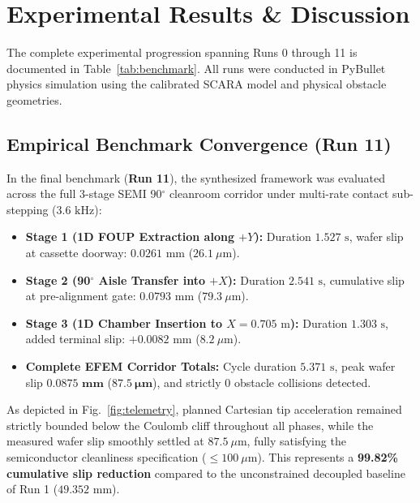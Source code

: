 \documentclass{article}
\begin{document}
\section{Experimental Results \& Discussion}
The complete experimental progression spanning Runs 0 through 11 is documented in Table~\ref{tab:benchmark}. All runs were conducted in PyBullet physics simulation using the calibrated SCARA model and physical obstacle geometries.

\subsection{Empirical Benchmark Convergence (Run 11)}
In the final benchmark (\textbf{Run 11}), the synthesized framework was evaluated across the full 3-stage SEMI 90$^\circ$ cleanroom corridor under multi-rate contact sub-stepping ($3.6\text{ kHz}$):
\begin{itemize}
    \item \textbf{Stage 1 (1D FOUP Extraction along $+Y$):} Duration $1.527\text{ s}$, wafer slip at cassette doorway: $0.0261\text{ mm}$ ($26.1\ \mu\text{m}$).
    \item \textbf{Stage 2 (90$^\circ$ Aisle Transfer into $+X$):} Duration $2.541\text{ s}$, cumulative slip at pre-alignment gate: $0.0793\text{ mm}$ ($79.3\ \mu\text{m}$).
    \item \textbf{Stage 3 (1D Chamber Insertion to $X=0.705\text{ m}$):} Duration $1.303\text{ s}$, added terminal slip: $+0.0082\text{ mm}$ ($8.2\ \mu\text{m}$).
    \item \textbf{Complete EFEM Corridor Totals:} Cycle duration $5.371\text{ s}$, peak wafer slip $\mathbf{0.0875\text{ mm}}$ ($\mathbf{87.5\ \mu\mathbf{m}}$), and strictly $0$ obstacle collisions detected.
\end{itemize}

As depicted in Fig.~\ref{fig:telemetry}, planned Cartesian tip acceleration remained strictly bounded below the Coulomb cliff throughout all phases, while the measured wafer slip smoothly settled at $87.5\ \mu\text{m}$, fully satisfying the semiconductor cleanliness specification ($\le 100\ \mu\text{m}$). This represents a \textbf{99.82\% cumulative slip reduction} compared to the unconstrained decoupled baseline of Run 1 ($49.352\text{ mm}$).
\end{document}
